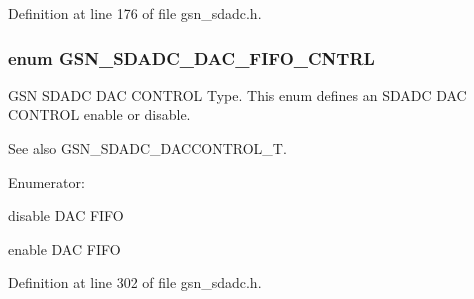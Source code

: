 Definition at line 176 of file gsn\_\-sdadc.h.

\hypertarget{a00652_ga3309e966fa4f0d2d297dae6a3bed9599}{
\subsubsection[{GSN\_\-SDADC\_\-DAC\_\-FIFO\_\-CNTRL}]{\setlength{\rightskip}{0pt plus 5cm}enum {\bf GSN\_\-SDADC\_\-DAC\_\-FIFO\_\-CNTRL}}}
\label{a00652_ga3309e966fa4f0d2d297dae6a3bed9599}


GSN SDADC DAC CONTROL Type. This enum defines an SDADC DAC CONTROL enable or disable. 

\begin{DoxySeeAlso}{See also}
GSN\_\-SDADC\_\-DACCONTROL\_\-T. 
\end{DoxySeeAlso}
\begin{Desc}
\item[Enumerator: ]\par
\begin{description}
\item[{\em 
\hypertarget{a00652_gga3309e966fa4f0d2d297dae6a3bed9599a7b4646d1784a530487178eecfefaef40}{
GSN\_\-SDADC\_\-DAC\_\-FIFO\_\-CNTRL\_\-DISABLE}
\label{a00652_gga3309e966fa4f0d2d297dae6a3bed9599a7b4646d1784a530487178eecfefaef40}
}]disable DAC FIFO \item[{\em 
\hypertarget{a00652_gga3309e966fa4f0d2d297dae6a3bed9599a2f3f695f476584ffb2194191bf43b6ee}{
GSN\_\-SDADC\_\-DAC\_\-FIFO\_\-CNTRL\_\-ENABLE}
\label{a00652_gga3309e966fa4f0d2d297dae6a3bed9599a2f3f695f476584ffb2194191bf43b6ee}
}]enable DAC FIFO \end{description}
\end{Desc}



Definition at line 302 of file gsn\_\-sdadc.h.

